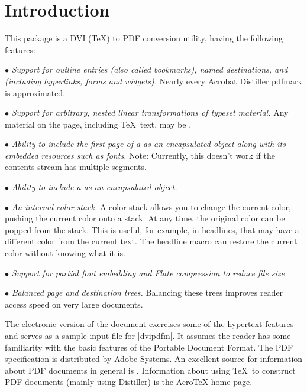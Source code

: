 \section{Introduction}
This package is a DVI (\TeX) to PDF conversion utility,
having the following features:

\beginlist
\item{$\bullet$} {\it Support for outline entries (also called bookmarks), named destinations,
and  (including hyperlinks, forms and widgets).}  Nearly
every Acrobat Distiller pdfmark is approximated.

\item{$\bullet$} {\it Support for arbitrary, nested linear transformations
of typeset material.}  Any material on the page, including
\TeX\ text, may be   .

\item{$\bullet$} {\it Ability to include the first page of a  as
an encapsulated object along with its embedded resources such as fonts.}
Note:  Currently, this doesn't work if the contents stream
has multiple segments. 

\item{$\bullet$} {\it Ability to include a  as an encapsulated
object.}

\item{$\bullet$} {\it An internal color stack.} A color stack allows you to change the current color, pushing the
current color onto a stack.  At any time, the original color
can be popped from the stack.  This is useful, for example, in
headlines, that may have a different color from the current text.
The headline macro can restore the current color without knowing
what it is.

\item{$\bullet$} {\it Support for partial font embedding and Flate compression
to reduce file size}

\item{$\bullet$} {\it Balanced page and destination trees.} Balancing
these trees improves reader access speed 
on very large documents.

\endlist

The electronic version of the document exercises
some of the hypertext features and serves as
a sample input file for |dvipdfm|.
It assumes the reader has some familiarity with the basic features
of the Portable Document Format.  The PDF specification
is distributed by Adobe Systems.
An excellent source for information about PDF documents
in general is .  Information about
using \TeX\ to construct PDF documents (mainly using Distiller) is the
AcroTeX home page.

